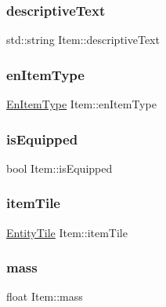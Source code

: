 \subsubsection{\texorpdfstring{descriptive\+Text}{descriptiveText}}
{\footnotesize\ttfamily std\+::string Item\+::descriptive\+Text\hspace{0.3cm}{\ttfamily [private]}}

\mbox{\label{class_item_a132d392fc3cd4c7dfa06ceaa0888a491}} 
\subsubsection{\texorpdfstring{en\+Item\+Type}{enItemType}}
{\footnotesize\ttfamily \mbox{\hyperlink{_equipment_8hpp_a3c7fe24829a0b210a1a4d36e29ac01c6}{En\+Item\+Type}} Item\+::en\+Item\+Type\hspace{0.3cm}{\ttfamily [private]}}

\mbox{\label{class_item_a47a03cb11d41796494640d62f4d6b9d2}} 
\subsubsection{\texorpdfstring{is\+Equipped}{isEquipped}}
{\footnotesize\ttfamily bool Item\+::is\+Equipped\hspace{0.3cm}{\ttfamily [private]}}

\mbox{\label{class_item_a9ba716084bdafdbd767aade37259b56b}} 
\subsubsection{\texorpdfstring{item\+Tile}{itemTile}}
{\footnotesize\ttfamily \mbox{\hyperlink{class_entity_tile}{Entity\+Tile}} Item\+::item\+Tile}

\mbox{\label{class_item_a59f0500b0a1a2c5e6590deb7ff58db7b}} 
\subsubsection{\texorpdfstring{mass}{mass}}
{\footnotesize\ttfamily float Item\+::mass\hspace{0.3cm}{\ttfamily [private]}}

